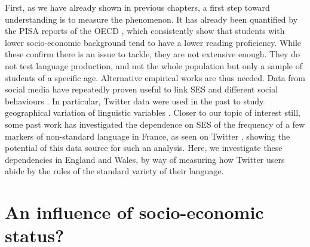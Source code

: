 \documentclass[../thesis.tex]{subfiles}
\begin{document}
First, as we have already shown in previous chapters, a first step toward understanding
is to measure the phenomenon. It has already been quantified by the PISA reports of the
OECD \cite{OECDWhereAll2019}, which consistently show that students with lower
socio-economic background tend to have a lower reading proficiency. While these confirm
there is an issue to tackle, they are not extensive enough. They do not test language
production, and not the whole population but only a sample of students of a specific
age. Alternative empirical works are thus needed. Data from social media have repeatedly
proven useful to link \ac{SES} and different social behaviours
\cite{GaoComputationalSocioeconomics2019}. In particular, Twitter data were used in the
past to study geographical variation of linguistic variables
\cite{EisensteinDiffusionLexical2014}. Closer to our topic of interest still, some past
work has investigated the dependence on \ac{SES} of the frequency of a few markers of
non-standard language in France, as seen on Twitter
\cite{AbitbolSocioeconomicDependencies2018}, showing the potential of this data source
for such an analysis. Here, we
investigate these dependencies in England and Wales, by way of measuring how Twitter
users abide by the rules of the standard variety of their language.



\section{An influence of socio-economic status?}
\end{document}
